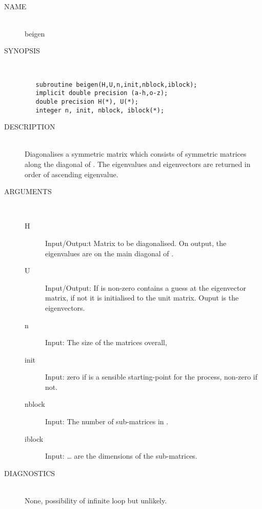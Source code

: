 \begin{boxedminipage}{4.5in}
\ \\
\begin{description}
\item[NAME]  \      \\
beigen
\item[SYNOPSIS] \ \\
\begin{verbatim}
   subroutine beigen(H,U,n,init,nblock,iblock);
   implicit double precision (a-h,o-z);
   double precision H(*), U(*);
   integer n, init, nblock, iblock(*);

\end{verbatim}
\item[DESCRIPTION] \ \\
Diagonalises a symmetric matrix which consists of 
symmetric matrices along the diagonal of . The eigenvalues and
eigenvectors are returned in order of ascending eigenvalue.
\item[ARGUMENTS] \  \\
\begin{description}
\item[H] Input/Outpu:t Matrix to be diagonalised. On output, the
eigenvalues are on the main diagonal of .
\item[U] Input/Output: If  is non-zero  contains a
guess at
the eigenvector matrix, if not it is initialised to the unit matrix.
Ouput is the eigenvectors.
\item[n] Input: The size of the matrices overall,
\item[init] Input: zero if  is a sensible starting-point for the
process, non-zero if not.
\item[nblock] Input: The number of sub-matrices in .
\item[iblock] Input:  \ldots {} are the
dimensions of the sub-matrices.
\end{description}

\item[DIAGNOSTICS] \  \\
None, possibility of infinite loop but unlikely.
\ \\ \ \\
\end{description}
\end{boxedminipage}
\clearpage


